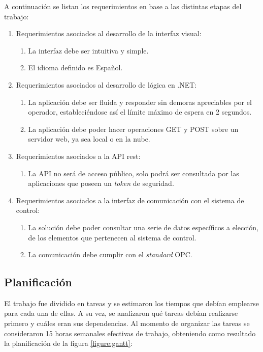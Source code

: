 A continuación se listan los requerimientos en base a las distintas etapas del trabajo:

\begin{enumerate}
\item Requerimientos asociados al desarrollo de la interfaz visual:
	\begin{enumerate}
	\item La interfaz debe ser intuitiva y simple.
	\item El idioma definido es Español.
	\end{enumerate}
\item Requerimientos asociados al desarrollo de lógica en .NET:
	\begin{enumerate}
	\item La aplicación debe ser fluida y responder sin demoras apreciables por el operador, estableciéndose así el límite máximo de espera en 2 segundos.
	\item La aplicación debe poder hacer operaciones GET y POST sobre un servidor web, ya sea local o en la nube.
	\end{enumerate}
\item Requerimientos asociados a la API rest:
	\begin{enumerate}
	\item La API no será de acceso público, solo podrá ser consultada por las aplicaciones que poseen un \textit{token} de seguridad.
	\end{enumerate}
\item Requerimientos asociados a la interfaz de comunicación con el sistema de control:	
	\begin{enumerate}	
	\item La solución debe poder consultar una serie de datos específicos a elección, de los elementos que pertenecen al sistema de control.
	\item La comunicación debe cumplir con el \textit{standard} OPC.
	\end{enumerate}
\end{enumerate}

\subsection{Planificación}

El trabajo fue dividido en tareas y se estimaron los tiempos que debían emplearse para cada una de ellas. A su vez, se analizaron qué tareas debían realizarse primero y cuáles eran sus dependencias. Al momento de organizar las tareas se consideraron 15 horas semanales efectivas de trabajo, obteniendo como resultado la planificación de la figura \ref{figure:gantt}:

